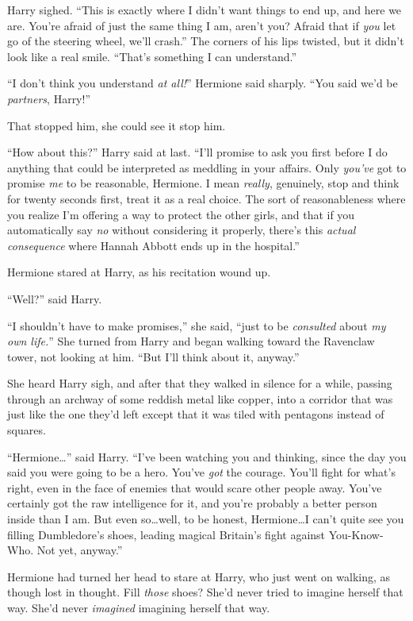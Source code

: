 Harry sighed.
“This is exactly where I didn’t want things to end up, and here we are. You’re afraid of just the same thing I am, aren’t you? Afraid that if \emph{you} let go of the steering wheel, we’ll crash.” The corners of his lips twisted, but it didn’t look like a real smile.
“That’s something I can understand.”

“I don’t think you understand \emph{at all!}” Hermione said sharply.
“You said we’d be \emph{partners}, Harry!”

That stopped him, she could see it stop him.

“How about this?” Harry said at last.
“I’ll promise to ask you first before I do anything that could be interpreted as meddling in your affairs. Only \emph{you’ve} got to promise \emph{me} to be reasonable, Hermione. I mean \emph{really}, genuinely, stop and think for twenty seconds first, treat it as a real choice. The sort of reasonableness where you realize I’m offering a way to protect the other girls, and that if you automatically say \emph{no} without considering it properly, there’s this \emph{actual consequence} where Hannah Abbott ends up in the hospital.”

Hermione stared at Harry, as his recitation wound up.

“Well?” said Harry.

“I shouldn’t have to make promises,” she said, “just to be \emph{consulted} about \emph{my own life.}” She turned from Harry and began walking toward the Ravenclaw tower, not looking at him.
“But I’ll think about it, anyway.”

She heard Harry sigh, and after that they walked in silence for a while, passing through an archway of some reddish metal like copper, into a corridor that was just like the one they’d left except that it was tiled with pentagons instead of squares.

“Hermione…” said Harry.
“I’ve been watching you and thinking, since the day you said you were going to be a hero. You’ve \emph{got} the courage. You’ll fight for what’s right, even in the face of enemies that would scare other people away. You’ve certainly got the raw intelligence for it, and you’re probably a better person inside than I am. But even so…well, to be honest, Hermione…I can’t quite see you filling Dumbledore’s shoes, leading magical Britain’s fight against You-Know-Who. Not yet, anyway.”

Hermione had turned her head to stare at Harry, who just went on walking, as though lost in thought. Fill \emph{those} shoes? She’d never tried to imagine herself that way. She’d never \emph{imagined} imagining herself that way.


